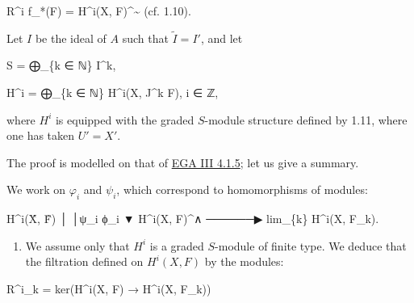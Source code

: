 \documentclass[
  11pt,
  a4paper,
]{book}
\newenvironment{Shaded}{}{}
\newcommand{\NormalTok}[1]{#1}
\providecommand{\tightlist}{%
  \setlength{\itemsep}{0pt}\setlength{\parskip}{0pt}}
\begin{document}
\begin{Shaded}
\begin{Highlighting}[]
\NormalTok{R\^{}i f\_*(F) = H\^{}i(X, F)\^{}\textasciitilde{}     (cf. 1.10).}
\end{Highlighting}
\end{Shaded}

Let \(I\) be the ideal of \(A\) such that \(\tilde{I} = I'\), and let

\begin{Shaded}
\begin{Highlighting}[]
\NormalTok{S = ⨁\_\{k ∈ ℕ\} I\^{}k,}
\end{Highlighting}
\end{Shaded}

\begin{Shaded}
\begin{Highlighting}[]
\NormalTok{H\^{}i = ⨁\_\{k ∈ ℕ\} H\^{}i(X, J\^{}k F),    i ∈ ℤ,}
\end{Highlighting}
\end{Shaded}

where \(H^{i}\) is equipped with the graded \(S\)-module structure
defined by 1.11, where one has taken \(U' = X'\).

The proof is modelled on that of
\href{https://jcreinhold.github.io/ega/iii/11-ch3-04-fundamental-theorem-proper-morphisms.html\#41-the-fundamental-theorem}{EGA
III 4.1.5}; let us give a summary.

We work on \(\varphi_{i}\) and \(\psi_{i}\), which correspond to
homomorphisms of modules:

\begin{Shaded}
\begin{Highlighting}[]
\NormalTok{                              H\^{}i(X̂, F̂)}
\NormalTok{                                  │}
\NormalTok{                                  │ψ\_i}
\NormalTok{                  ϕ\_i             ▼}
\NormalTok{   H\^{}i(X, F)\^{}∧  ──────▶  lim\_\{k\} H\^{}i(X, F\_k).}
\end{Highlighting}
\end{Shaded}

\begin{enumerate}
\def\labelenumi{(\alph{enumi})}
\tightlist
\item
  We assume only that \(H^{i}\) is a graded \(S\)-module of finite type.
  We deduce that the filtration defined on \(H^{i}(X, F)\) by the
  modules:
\end{enumerate}

\begin{Shaded}
\begin{Highlighting}[]
\NormalTok{R\^{}i\_k = ker(H\^{}i(X, F) → H\^{}i(X, F\_k))}
\end{Highlighting}
\end{Shaded}
\end{document}
